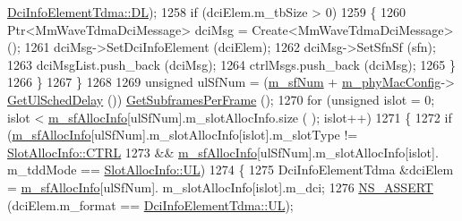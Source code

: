 \begin{DoxyCode}
      \hyperlink{structns3_1_1DciInfoElementTdma_af998ccd3b1e03836c113d353facc76f4a6497273a219b44fa44ea3a6ea608bfcb}{DciInfoElementTdma::DL});
1258                                 \textcolor{keywordflow}{if} (dciElem.m\_tbSize > 0)
1259                                 \{
1260                                         Ptr<MmWaveTdmaDciMessage> dciMsg = Create<MmWaveTdmaDciMessage> ();
1261                                         dciMsg->SetDciInfoElement (dciElem);
1262                                         dciMsg->SetSfnSf (sfn);
1263                                         dciMsgList.push\_back (dciMsg);
1264                                         ctrlMsgs.push\_back (dciMsg);
1265                                 \}
1266                         \}
1267                 \}
1268 
1269                 \textcolor{keywordtype}{unsigned} ulSfNum = (\hyperlink{classns3_1_1MmWavePhy_af3d76eb9f3e5e1ff669852d05986c1a3}{m\_sfNum} + \hyperlink{classns3_1_1MmWavePhy_a869abf36bbdbb94eed77ba6e4846f6e4}{m\_phyMacConfig}->
      \hyperlink{classns3_1_1MmWavePhyMacCommon_afd70935ec71838fefe6a8e18198f19cb}{GetUlSchedDelay} ()) %
      \hyperlink{classns3_1_1MmWavePhyMacCommon_a3709cf52f6813eb8ad1af16d95082dc1}{GetSubframesPerFrame} ();
1270                 \textcolor{keywordflow}{for} (\textcolor{keywordtype}{unsigned} islot = 0; islot < \hyperlink{classns3_1_1MmWavePhy_a6e7002b99b8c50976033e0b96523f08c}{m\_sfAllocInfo}[ulSfNum].m\_slotAllocInfo.size (
      ); islot++)
1271                 \{
1272                         \textcolor{keywordflow}{if} (\hyperlink{classns3_1_1MmWavePhy_a6e7002b99b8c50976033e0b96523f08c}{m\_sfAllocInfo}[ulSfNum].m\_slotAllocInfo[islot].m\_slotType != 
      \hyperlink{structns3_1_1SlotAllocInfo_a3ea7cb503bfd0c9a4df55a71b81b9331ad78b7d76ef82d56c33be1fa9c1867409}{SlotAllocInfo::CTRL}
1273                                         && \hyperlink{classns3_1_1MmWavePhy_a6e7002b99b8c50976033e0b96523f08c}{m\_sfAllocInfo}[ulSfNum].m\_slotAllocInfo[islot].
      m\_tddMode == \hyperlink{structns3_1_1SlotAllocInfo_a6cad60db1d39034f1851e2cea625fe5da916b5be54594ead6ed677c570311cad2}{SlotAllocInfo::UL})
1274                         \{
1275                                 DciInfoElementTdma &dciElem = \hyperlink{classns3_1_1MmWavePhy_a6e7002b99b8c50976033e0b96523f08c}{m\_sfAllocInfo}[ulSfNum].
      m\_slotAllocInfo[islot].m\_dci;
1276                                 \hyperlink{assert_8h_a6dccdb0de9b252f60088ce281c49d052}{NS\_ASSERT} (dciElem.m\_format == 
      \hyperlink{structns3_1_1DciInfoElementTdma_af998ccd3b1e03836c113d353facc76f4a8611bf12ef88d043baf0e591bc63b314}{DciInfoElementTdma::UL});

\end{DoxyCode}
